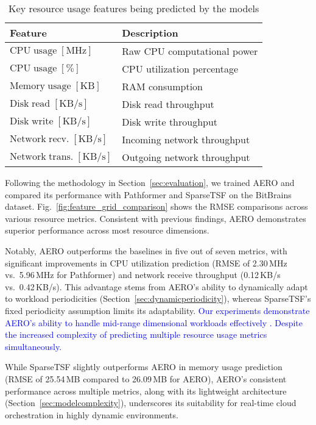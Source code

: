 \documentclass{ieeetmlcn}
\begin{document}
\begin{table}
\centering
\begin{tabular}{p{}p{}}
\hline
\textbf{Feature} & \textbf{Description} \\
\hline
$\mathrm{CPU\;usage\;[MHz]}$ & Raw CPU computational power \\
$\mathrm{CPU\;usage\;[\%]}$ & CPU utilization percentage \\
$\mathrm{Memory\;usage\;[KB]}$ & RAM consumption \\
$\mathrm{Disk\;read\;[KB/s]}$ & Disk read throughput \\
$\mathrm{Disk\;write\;[KB/s]}$ & Disk write throughput \\
$\mathrm{Network\;recv.\;[KB/s]}$ & Incoming network throughput \\
$\mathrm{Network\;trans.\;[KB/s]}$ & Outgoing network throughput \\
\hline
\end{tabular}
\caption{Key resource usage features being predicted by the models}
\label{tab:predicted_features}
\end{table}

Following the methodology in Section~\ref{sec:evaluation}, we trained AERO and compared its performance with Pathformer and SparseTSF on the BitBrains dataset. Fig.~\ref{fig:feature_grid_comparison} shows the RMSE comparisons across various resource metrics. Consistent with previous findings, AERO demonstrates superior performance across most resource dimensions.

Notably, AERO outperforms the baselines in five out of seven metrics, with significant improvements in CPU utilization prediction (RMSE of 2.30\,MHz vs.\ 5.96\,MHz for Pathformer) and network receive throughput (0.12\,KB/s vs.\ 0.42\,KB/s). This advantage stems from AERO's ability to dynamically adapt to workload periodicities (Section~\ref{sec:dynamicperiodicity}), whereas SparseTSF's fixed periodicity assumption limits its adaptability. \textcolor{blue}{Our experiments demonstrate AERO's ability to handle mid-range dimensional workloads effectively . Despite the increased complexity of predicting multiple resource usage metrics simultaneously.
}

While SparseTSF slightly outperforms AERO in memory usage prediction (RMSE of 25.54\,MB compared to 26.09\,MB for AERO), AERO's consistent performance across multiple metrics, along with its lightweight architecture (Section~\ref{sec:modelcomplexity}), underscores its suitability for real-time cloud orchestration in highly dynamic environments.
\end{document}
